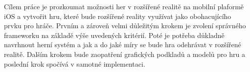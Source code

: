 \documentclass[oneside,12pt]{article}
\begin{document}
%
%
%
%
%
%

Cílem práce je prozkoumat možnosti her v rozšířené realitě na mobilní plaformě iOS a vytvořit hru, které bude rozšířené reality využívat jako obohacujícího prvku pro hráče. Prvním a zároveň velmi důležitým krokem je zvolení správného frameworku na základě výše uvedených kritérií. Poté je potřeba důkladně navrhnout herní systém a jak a do jaké míry se bude hra odehrávat v rozšířené realitě. Dalším krokem bude zaopatření grafických podkladů a modelů pro hru a poslední krok spočívá v samotné implementaci.
\end{document}
